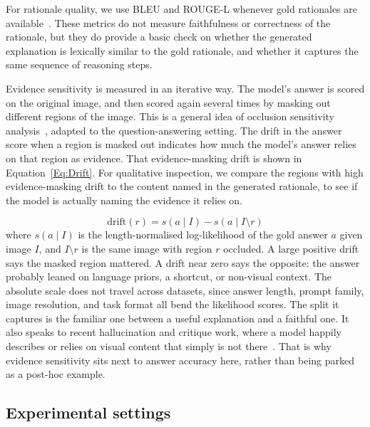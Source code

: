 \documentclass[preprint,12pt]{elsarticle}
\begin{document}
For rationale quality, we use BLEU and ROUGE-L whenever gold rationales are available~\cite{papineni2002bleu,lin2004rouge}.
These metrics do not measure faithfulness or correctness of the rationale, but they do provide a basic check on 
whether the generated explanation is lexically similar to the gold rationale, and whether it captures the same sequence of reasoning steps.

Evidence sensitivity is measured in an iterative way.
The model's answer is scored on the original image, and then scored again several times by masking out different regions of the image.
This is a general idea of occlusion sensitivity analysis~\cite{zeiler2014visualizing}, adapted to the question-answering setting.
The drift in the answer score when a region is masked out indicates how much the model's answer relies on that region as evidence.
That evidence-masking drift is shown in Equation~\ref{Eq:Drift}.
For qualitative inspection, we compare the regions with high evidence-masking drift to the content named in the generated rationale,
to see if the model is actually naming the evidence it relies on.

\begin{equation}
    \mathrm{drift}(r) = s\!\left(a \mid I\right) - s\!\left(a \mid I \setminus r\right)
    \label{Eq:Drift}
\end{equation}
where $s(a \mid I)$ is the length-normalised log-likelihood of the gold answer $a$ given image $I$, and $I \setminus r$ is the same image with region $r$ occluded.
A large positive drift says the masked region mattered.
A drift near zero says the opposite: the answer probably leaned on language priors, a shortcut, or non-visual context.
The absolute scale does not travel across datasets, since answer length, prompt family, image resolution, and task format all bend the likelihood scores.
The split it captures is the familiar one between a useful explanation and a faithful one.
It also speaks to recent hallucination and critique work, where a model happily describes or relies on visual content that simply is not there~\cite{guan2024hallusionbench,jiang2024hacl,wu2025visco,zhang2025criticv}.
That is why evidence sensitivity sits next to answer accuracy here, rather than being parked as a post-hoc example.

\subsection{Experimental settings}
\end{document}
